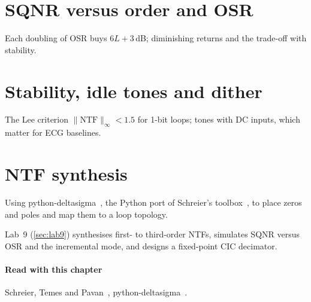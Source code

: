 \section{SQNR versus order and OSR}\label{sec:ch19-2}
Each doubling of OSR buys $6L + 3$\,dB; diminishing returns and the trade-off with stability.

\section{Stability, idle tones and dither}\label{sec:ch19-3}
The Lee criterion $\lVert \mathrm{NTF}\rVert_\infty < 1.5$ for 1-bit loops; tones with DC inputs, which matter for ECG baselines.

\section{NTF synthesis}\label{sec:ch19-4}
Using python-deltasigma~\cite{pydeltasigma}, the Python port of Schreier's toolbox~\cite{schreier}, to place zeros and poles and map them to a loop topology.

\begin{tryit}
Lab~9 (\cref{sec:lab9}) synthesises first- to third-order NTFs, simulates SQNR versus OSR and the incremental mode, and designs a fixed-point CIC decimator.
\end{tryit}

\paragraph{Read with this chapter} Schreier, Temes and Pavan~\cite{schreier}, python-deltasigma~\cite{pydeltasigma}.
